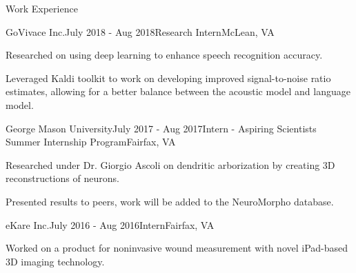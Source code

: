 \documentclass{template} %
\begin{document}
\begin{rSection}{Work Experience}
\begin{rSubsection}{GoVivace Inc.}{July 2018 - Aug 2018}{Research Intern}{McLean, VA}
\item Researched on using deep learning to enhance speech recognition accuracy.
\item Leveraged Kaldi toolkit to work on developing improved signal-to-noise ratio estimates, allowing for a better balance between the acoustic model and language model.
\end{rSubsection}

\begin{rSubsection}{George Mason University}{July 2017 - Aug 2017}{Intern - Aspiring Scientists Summer Internship Program}{Fairfax, VA}
\item Researched under Dr. Giorgio Ascoli on dendritic arborization by creating 3D reconstructions of neurons.
\item Presented results to peers, work will be added to the NeuroMorpho database.
\end{rSubsection}

\begin{rSubsection}{eKare Inc.}{July 2016 - Aug 2016}{Intern}{Fairfax, VA}
\item Worked on a product for noninvasive wound measurement with novel iPad-based 3D imaging technology.
\end{rSubsection}

\end{rSection}

\newpage
\end{document}
